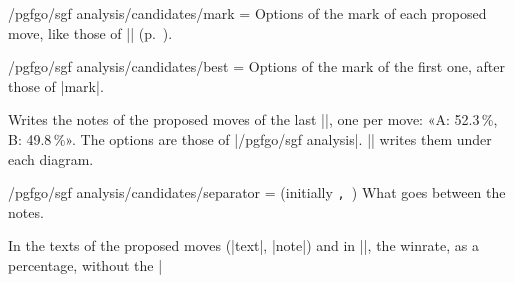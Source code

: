 \begin{key}{/pgfgo/sgf analysis/candidates/mark = }
	Options of the mark of each proposed move, like those of |\marks| (p.~\pageref{sec:marcas}).
\end{key}

\begin{key}{/pgfgo/sgf analysis/candidates/best = }
	Options of the mark of the first one, after those of |mark|.

	\begin{codeexample}[]
		\begin{goban}[9, scale = 0.6]
		\end{goban}
	\end{codeexample}
\end{key}

\begin{command}{\pgfgocandidates{}}
	Writes the notes of the proposed moves of the last |\sgf|, one per move: «A: 52.3\,\%, B: 49.8\,\%». The options are those of |/pgfgo/sgf analysis|. |\sgfdiagrams| writes them under each diagram.
\end{command}


\begin{key}{/pgfgo/sgf analysis/candidates/separator =  (initially \texttt{,\string~})}
	What goes between the notes.
\end{key}

\begin{command}{\pgfgowinrate}
	In the texts of the proposed moves (|text|, |note|) and in |\sgfinfo|, the winrate, as a percentage, without the |%
\end{command}

